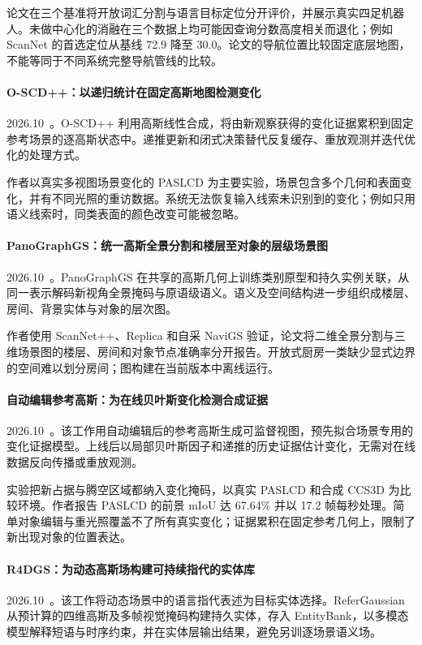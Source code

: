 论文在三个基准将开放词汇分割与语言目标定位分开评价，并展示真实四足机器人。未做中心化的消融在三个数据上均可能因查询分数高度相关而退化；例如 ScanNet 的首选定位从基线 72.9 降至 30.0。论文的导航位置比较固定底层地图，不能等同于不同系统完整导航管线的比较。

\paragraph{O-SCD++：以递归统计在固定高斯地图检测变化}
2026.10~\cite{2610_24462}。O-SCD++ 利用高斯线性合成，将由新观察获得的变化证据累积到固定参考场景的逐高斯状态中。递推更新和闭式决策替代反复缓存、重放观测并迭代优化的处理方式。

作者以真实多视图场景变化的 PASLCD 为主要实验，场景包含多个几何和表面变化，并有不同光照的重访数据。系统无法恢复输入线索未识别到的变化；例如只用语义线索时，同类表面的颜色改变可能被忽略。

\paragraph{PanoGraphGS：统一高斯全景分割和楼层至对象的层级场景图}
2026.10~\cite{2610_27696}。PanoGraphGS 在共享的高斯几何上训练类别原型和持久实例关联，从同一表示解码新视角全景掩码与原语级语义。语义及空间结构进一步组织成楼层、房间、背景实体与对象的层次图。

作者使用 ScanNet++、Replica 和自采 NaviGS 验证，论文将二维全景分割与三维场景图的楼层、房间和对象节点准确率分开报告。开放式厨房一类缺少显式边界的空间难以划分房间；图构建在当前版本中离线运行。

\paragraph{自动编辑参考高斯：为在线贝叶斯变化检测合成证据}
2026.10~\cite{2610_28490}。该工作用自动编辑后的参考高斯生成可监督视图，预先拟合场景专用的变化证据模型。上线后以局部贝叶斯因子和递推的历史证据估计变化，无需对在线数据反向传播或重放观测。

实验把新占据与腾空区域都纳入变化掩码，以真实 PASLCD 和合成 CCS3D 为比较环境。作者报告 PASLCD 的前景 mIoU 达 67.64\% 并以 17.2 帧每秒处理。简单对象编辑与重光照覆盖不了所有真实变化；证据累积在固定参考几何上，限制了新出现对象的位置表达。

\paragraph{R4DGS：为动态高斯场构建可持续指代的实体库}
2026.10~\cite{2610_30326}。该工作将动态场景中的语言指代表述为目标实体选择。ReferGaussian 从预计算的四维高斯及多帧视觉掩码构建持久实体，存入 EntityBank，以多模态模型解释短语与时序约束，并在实体层输出结果，避免另训逐场景语义场。

